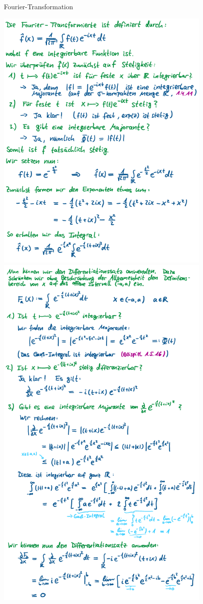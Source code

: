\begin{Beispiel}{Fourier-Transformation}
        \begin{center}
    \includegraphics[width=0.80\textwidth]{Dateien/Fourier_Transform_1.png}
    \includegraphics[width=0.80\textwidth]{Dateien/Fourier_Transform_2.png}

\end{center}
\end{Beispiel}
